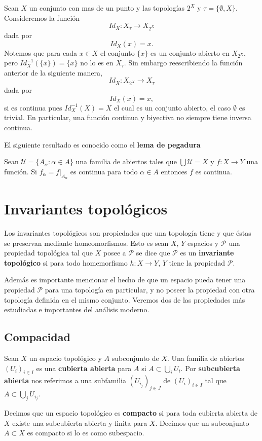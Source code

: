 \begin{ej}
Sean $X$ un conjunto con mas de un punto y las topologías $2^X$ y $\tau=\{\emptyset, X\}$. Consideremos la función $$Id_X:X_{\tau} \to X_{2^X}$$ dada por $$Id_X(x)=x.$$
Notemos que para cada $x \in X$ el conjunto $\{x\}$ es un conjunto abierto en $X_{2^X}$, pero $Id_X^{-1}(\{x\})= \{x\}$ no lo es en $X_\tau$. Sin embargo reescribiendo  la función anterior de la siguiente manera,  $$Id_X:X_{2^X} \to X_{\tau}$$ dada por $$Id_X(x)=x,$$
si es continua pues $Id_X^{-1}(X)=X$ el cual es un conjunto abierto, el caso $\emptyset$ es trivial. En particular, una función continua y biyectiva no siempre tiene inversa continua. 
\end{ej}

El siguiente resultado es conocido como el \textbf{lema de pegadura}

\begin{pr}
Sean $\mathcal{U}= \{A_\alpha :\alpha \in A\}$ una familia de abiertos tales que $\bigcup \mathcal{U} = X$ y $f:X \to Y$ una función. Si $f_\alpha=f|_{A_\alpha}$ es continua para todo $\alpha \in A$ entonces $f$ es continua.  
\end{pr}

\section*{Invariantes topológicos}

Los invariantes topológicos son propiedades que una topología tiene y que éstas se preservan mediante homeomorfismos. Esto es sean $X$, $Y$ espacios y $\mathcal{P}$ una propiedad topológica tal que $X$ posee a $\mathcal{P}$ se dice que $\mathcal{P}$ es un \textbf{invariante topológico} si para todo homemorfismo $h:X \to Y$,  $Y$ tiene la propiedad $\mathcal{P}$.


Además es importante mencionar el hecho de que un espacio pueda tener una propiedad $\mathcal{P}$ para una topología en particular, y no poseer la propiedad con otra topología definida en el mismo conjunto. Veremos dos de las  propiedades más estudiadas e 
importantes del análisis moderno. 

\subsection*{Compacidad}

\begin{df}
Sean $X$ un espacio topológico y  $A$ subconjunto de $X$. Una familia de abiertos $(U_i)_{i \in I}$ es una \textbf{cubierta abierta} para $A$ si $A \subset \bigcup_i U_i.$ Por \textbf{subcubierta abierta} nos referimos a una subfamilia $(U_{i_j} )_{j \in J}$ de $(U_i)_{i \in I}$ tal que $ A \subset \bigcup_j U_{i_j}.$

Decimos que un espacio topológico es \textbf{compacto} si para toda cubierta abierta de $X$ existe una subcubierta abierta y finita para $X$. Decimos que un subconjunto $A \subset X$ es compacto si lo es como subespacio.
\end{df}

